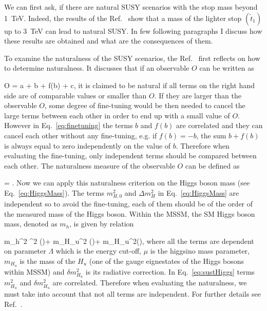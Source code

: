 We can first ask, if there are natural SUSY scenarios with the stop mass beyond 1~TeV. Indeed, the results of the Ref.~\cite{Baer:2016bwh} show that a mass of the lighter stop $(\tilde{t}_{1})$  up to 3~TeV can lead to natural SUSY. In few following paragraphs I discuss how these results are obtained and what are the consequences of them.

To examine the naturalness of the SUSY scenarios, the Ref.~\cite{Baer:2016bwh} first reflects on how to determine naturalness.  It discusses that if an observable $O$ can be written as

{
O = a + b + f(b) + c,
}
it is claimed to be natural if all terms on the right hand side are of comparable values or smaller than $O$. If they are larger than the observable $O$, some degree of fine-tuning would be then needed to cancel the large terms between each other in order to end up with a small value of $O$. However in Eq.~\ref{eq:finetuning} the terms $b$ and $f(b)$ are correlated and they can cancel each other without any fine-tuning, e.g. if $f(b) = -b$, the sum $b+f(b)$ is always equal to zero independently on the value of $b$. Therefore when evaluating the fine-tuning, only independent terms should be compared between each other. The naturalness measure of the observable $O$ can be defined as 

{
\Delta = .
}
Now we can apply this naturalness criterion on the Higgs boson mass (see Eq.~\ref{eq:HiggsMass}).  The terms $m_{H,0}^{2}$ and $\Delta m_{H}^{2}$ in Eq.~\ref{eq:HiggsMass} are independent so to avoid the fine-tuning, each of them should be of the order of the measured mass of the Higgs boson. Within the MSSM, the SM Higgs boson mass, denoted as $m_{h}$, is given by relation

{
m_{h}^{2}  \mu^{2} (\Lambda)+ m_{H_{u}}^{2} (\Lambda)+ \delta m_{H_{u}}^{2}(\Lambda),
}
where all the terms are dependent on parameter $\Lambda$ which is the energy cut-off, $\mu$ is the higgsino mass parameter, $m_{H_{u}}$ is the mass of the $H_{u}$ (one of the gauge eignestates of the Higgs bosons within MSSM)  and $\delta m_{H_{u}}^{2}$ is its radiative correction. In Eq.~\ref{eq:sustHiggs} terms $m_{H_{u}}^{2}$ and  $\delta m_{H_{u}}^{2}$ are correlated. Therefore when evaluating the naturalness, we must take into account that not all terms are independent. For further details see Ref.~\cite{Baer:2016bwh}.



